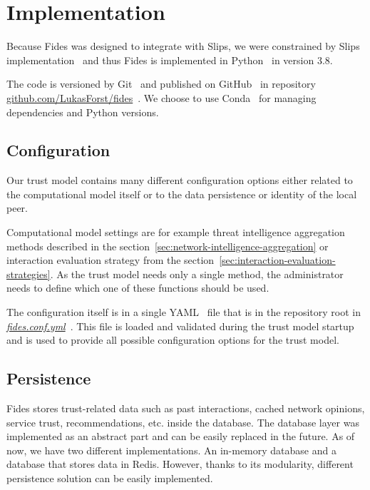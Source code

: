 \section{Implementation}
\label{sec:implementation}
Because Fides was designed to integrate with Slips, we were constrained by Slips implementation~\cite{slips} and thus Fides is implemented in Python~\cite{python} in version 3.8.

The code is versioned by Git~\cite{git} and published on GitHub~\cite{github} in repository \href{https://github.com/LukasForst/fides}{github.com/LukasForst/fides}~\cite{fidesGithub}.
We choose to use Conda~\cite{conda} for managing dependencies and Python versions.

\subsection{Configuration}
\label{subsec:configuration}
Our trust model contains many different configuration options either related to the computational model itself or to the data persistence or identity of the local peer.

Computational model settings are for example threat intelligence aggregation methods described in the section~\ref{sec:network-intelligence-aggregation} or interaction evaluation strategy from the section~\ref{sec:interaction-evaluation-strategies}.
As the trust model needs only a single method, the administrator needs to define which one of these functions should be used.

The configuration itself is in a single YAML~\cite{yaml} file that is in the repository root in \href{https://github.com/LukasForst/fides/blob/master/fides.conf.yml}{\textit{fides.conf.yml}}~\cite{fidesGithub}.
This file is loaded and validated during the trust model startup and is used to provide all possible configuration options for the trust model.

\subsection{Persistence}
\label{subsec:persistence}
Fides stores trust-related data such as past interactions, cached network opinions, service trust, recommendations, etc. inside the database.
The database layer was implemented as an abstract part and can be easily replaced in the future.
As of now, we have two different implementations. An in-memory database and a database that stores data in Redis.
However, thanks to its modularity, different persistence solution can be easily implemented.

